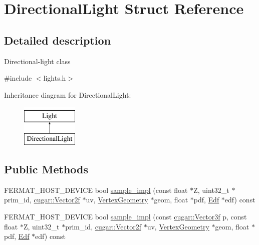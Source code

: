 \hypertarget{struct_directional_light}{}\section{Directional\+Light Struct Reference}
\label{struct_directional_light}


\subsection{Detailed description}
Directional-\/light class 

{\ttfamily \#include $<$lights.\+h$>$}

Inheritance diagram for Directional\+Light\+:\begin{figure}[H]
\begin{center}
\leavevmode
\includegraphics[height=2.000000cm]{struct_directional_light}
\end{center}
\end{figure}
\subsection*{Public Methods}
\begin{DoxyCompactItemize}
\item 
F\+E\+R\+M\+A\+T\+\_\+\+H\+O\+S\+T\+\_\+\+D\+E\+V\+I\+CE bool \hyperlink{struct_directional_light_af94d1e48aece7a3811f791fdabcbb11d}{sample\+\_\+impl} (const float $\ast$Z, uint32\+\_\+t $\ast$prim\+\_\+id, \hyperlink{structcugar_1_1_vector}{cugar\+::\+Vector2f} $\ast$uv, \hyperlink{struct_vertex_geometry}{Vertex\+Geometry} $\ast$geom, float $\ast$pdf, \hyperlink{struct_edf}{Edf} $\ast$edf) const
\item 
F\+E\+R\+M\+A\+T\+\_\+\+H\+O\+S\+T\+\_\+\+D\+E\+V\+I\+CE bool \hyperlink{struct_directional_light_a0f13eac548f1e19cb3098668ab2a8fcc}{sample\+\_\+impl} (const \hyperlink{structcugar_1_1_vector}{cugar\+::\+Vector3f} p, const float $\ast$Z, uint32\+\_\+t $\ast$prim\+\_\+id, \hyperlink{structcugar_1_1_vector}{cugar\+::\+Vector2f} $\ast$uv, \hyperlink{struct_vertex_geometry}{Vertex\+Geometry} $\ast$geom, float $\ast$pdf, \hyperlink{struct_edf}{Edf} $\ast$edf) const
\end{DoxyCompactItemize}
